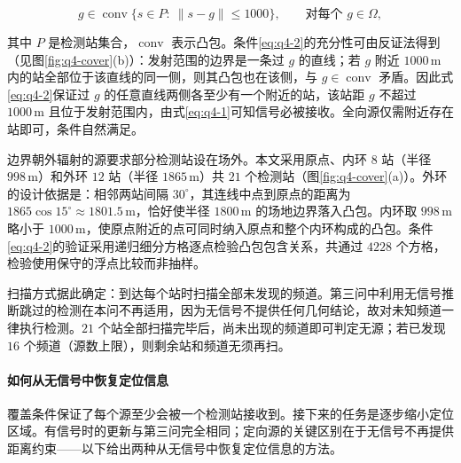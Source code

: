 \begin{equation}\label{eq:q4-2}
g\in\operatorname{conv}\{s\in P:\ \|s-g\|\le1000\},\qquad\text{对每个 } g\in\Omega ,
\end{equation}

其中 $P$ 是检测站集合，$\operatorname{conv}$ 表示凸包。条件\eqref{eq:q4-2}的充分性可由反证法得到（见图\ref{fig:q4-cover}(b)）：发射范围的边界是一条过 $g$ 的直线；若 $g$ 附近 $1000\,\mathrm{m}$ 内的站全部位于该直线的同一侧，则其凸包也在该侧，与 $g\in\operatorname{conv}$ 矛盾。因此式\eqref{eq:q4-2}保证过 $g$ 的任意直线两侧各至少有一个附近的站，该站距 $g$ 不超过 $1000\,\mathrm{m}$ 且位于发射范围内，由式\eqref{eq:q4-1}可知信号必被接收。全向源仅需附近存在站即可，条件自然满足。

边界朝外辐射的源要求部分检测站设在场外。本文采用原点、内环 $8$ 站（半径 $998\,\mathrm{m}$）和外环 $12$ 站（半径 $1865\,\mathrm{m}$）共 $21$ 个检测站（图\ref{fig:q4-cover}(a)）。外环的设计依据是：相邻两站间隔 $30^\circ$，其连线中点到原点的距离为 $1865\cos15^\circ\approx1801.5\,\mathrm{m}$，恰好使半径 $1800\,\mathrm{m}$ 的场地边界落入凸包。内环取 $998\,\mathrm{m}$ 略小于 $1000\,\mathrm{m}$，使原点附近的点可同时纳入原点和整个内环构成的凸包。条件\eqref{eq:q4-2}的验证采用递归细分方格逐点检验凸包包含关系，共通过 $4228$ 个方格，检验使用保守的浮点比较而非抽样。

扫描方式据此确定：到达每个站时扫描全部未发现的频道。第三问中利用无信号推断跳过的检测在本问不再适用，因为无信号不提供任何几何结论，故对未知频道一律执行检测。$21$ 个站全部扫描完毕后，尚未出现的频道即可判定无源；若已发现 $16$ 个频道（源数上限），则剩余站和频道无须再扫。

\begin{center}
\begin{minipage}{\linewidth}
\centering
\QFourCoverageFigure
{}
\label{fig:q4-cover}
\end{minipage}
\end{center}

\paragraph{如何从无信号中恢复定位信息}

覆盖条件保证了每个源至少会被一个检测站接收到。接下来的任务是逐步缩小定位区域。有信号时的更新与第三问完全相同；定向源的关键区别在于无信号不再提供距离约束——以下给出两种从无信号中恢复定位信息的方法。

